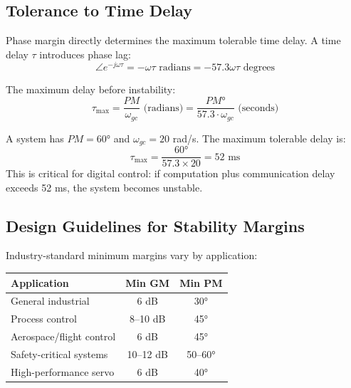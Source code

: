 \subsection{Tolerance to Time Delay}

Phase margin directly determines the maximum tolerable time delay. A time delay $\tau$ introduces phase lag:
\begin{equation}
\angle e^{-j\omega\tau} = -\omega\tau \text{ radians} = -57.3\omega\tau \text{ degrees}
\end{equation}

The maximum delay before instability:
\begin{equation}
\tau_{\max} = \frac{PM}{\omega_{gc}} \text{ (radians)} = \frac{PM°}{57.3 \cdot \omega_{gc}} \text{ (seconds)}
\label{eq:max_delay}
\end{equation}

\begin{example}
\label{ex:delay_tolerance}
A system has $PM = 60°$ and $\omega_{gc} = 20$ rad/s. The maximum tolerable delay is:
\begin{equation}
\tau_{\max} = \frac{60°}{57.3 \times 20} = 52 \text{ ms}
\end{equation}
This is critical for digital control: if computation plus communication delay exceeds 52 ms, the system becomes unstable.
\end{example}

\subsection{Design Guidelines for Stability Margins}

Industry-standard minimum margins vary by application:

\begin{center}
\begin{tabular}{lcc}
\toprule
\textbf{Application} & \textbf{Min GM} & \textbf{Min PM} \\
\midrule
General industrial & 6 dB & 30° \\
Process control & 8--10 dB & 45° \\
Aerospace/flight control & 6 dB & 45° \\
Safety-critical systems & 10--12 dB & 50--60° \\
High-performance servo & 6 dB & 40° \\
\bottomrule
\end{tabular}
\end{center}

